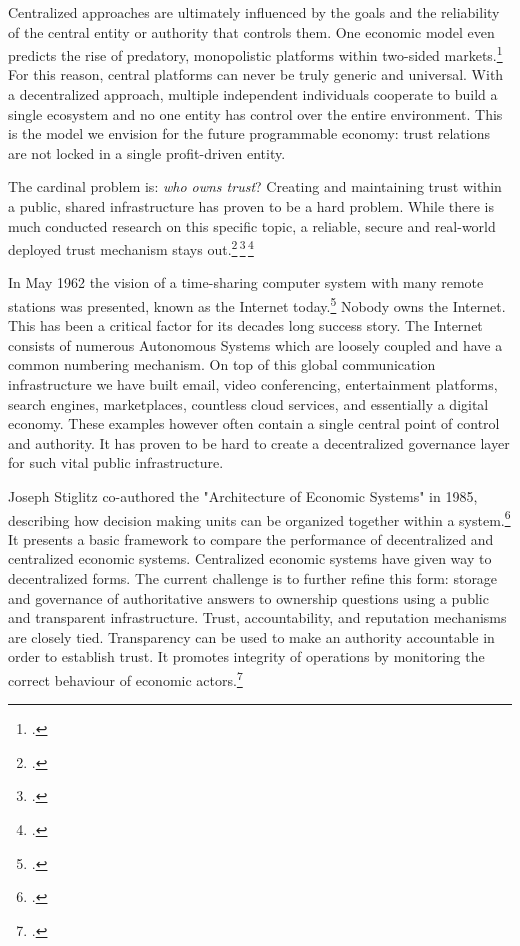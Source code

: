 \documentclass[USenglish]{article}
\begin{document}
Centralized approaches are ultimately influenced by the goals and the reliability of the central entity or authority that controls them. 
One economic model even predicts the rise of predatory, monopolistic platforms within two-sided markets.\footcite{loertscher2016predatory}
For this reason, central platforms can never be truly generic and universal. 
With a decentralized approach, multiple independent individuals cooperate to build a single ecosystem and no one entity has control over the entire environment.
This is the model we envision for the future programmable economy: trust relations are not locked in a single profit-driven entity.

The cardinal problem is: \emph{who owns trust}?
Creating and maintaining trust within a public, shared infrastructure has proven to be a hard problem.
While there is much conducted research on this specific topic, a reliable, secure and real-world deployed trust mechanism stays out.\footcite{delaviz2010improving}\,\footcite{delaviz2012sybilres}\,\footcite{kamvar2003eigentrust}

In May 1962 the vision of a time-sharing computer system with many remote stations was presented, known as the Internet today.\footcite{licklider1962line}
Nobody owns the Internet.
This has been a critical factor for its decades long success story.
The Internet consists of numerous Autonomous Systems which are loosely coupled and have a common numbering mechanism.
On top of this global communication infrastructure we have built email, video conferencing, entertainment platforms, search engines, marketplaces, countless cloud services, and essentially a digital economy.
These examples however often contain a single central point of control and authority.
It has proven to be hard to create a decentralized governance layer for such vital public infrastructure.

Joseph Stiglitz co-authored the "Architecture of Economic Systems" in 1985, describing how decision making units can be organized together within a system.\footcite{sah1985architecture}
It presents a basic framework to compare the performance of decentralized and centralized economic systems.
Centralized economic systems have given way to decentralized forms.
The current challenge is to further refine this form: storage and governance of authoritative answers to ownership questions using a public and transparent infrastructure.
Trust, accountability, and reputation mechanisms are closely tied.
Transparency can be used to make an authority accountable in order to establish trust. 
It promotes integrity of operations by monitoring the correct behaviour of economic actors.\footcite{troncoso2017systematizing}
\end{document}
